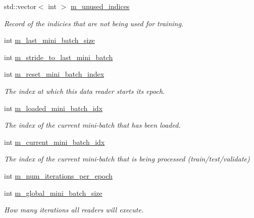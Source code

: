 \begin{DoxyCompactItemize}
\item 
std\+::vector$<$ int $>$ \hyperlink{classlbann_1_1generic__data__reader_a0bc0ee42e95d23687ddcc30d6c338b19}{m\+\_\+unused\+\_\+indices}
\begin{DoxyCompactList}\small\item\em Record of the indicies that are not being used for training. \end{DoxyCompactList}\item 
int \hyperlink{classlbann_1_1generic__data__reader_a241f77b6209de4ae656bc34ad51bb612}{m\+\_\+last\+\_\+mini\+\_\+batch\+\_\+size}
\item 
int \hyperlink{classlbann_1_1generic__data__reader_ac46922f2ef4f392bcc7c59c21685a3ff}{m\+\_\+stride\+\_\+to\+\_\+last\+\_\+mini\+\_\+batch}
\item 
int \hyperlink{classlbann_1_1generic__data__reader_af29f62579a408d1548a124442bcf181d}{m\+\_\+reset\+\_\+mini\+\_\+batch\+\_\+index}
\begin{DoxyCompactList}\small\item\em The index at which this data reader starts its epoch. \end{DoxyCompactList}\item 
int \hyperlink{classlbann_1_1generic__data__reader_a2cfc5a3e6de8a8a24d3525ec3ed586fb}{m\+\_\+loaded\+\_\+mini\+\_\+batch\+\_\+idx}
\begin{DoxyCompactList}\small\item\em The index of the current mini-\/batch that has been loaded. \end{DoxyCompactList}\item 
int \hyperlink{classlbann_1_1generic__data__reader_aefd4bc0bf95de1e2500827581acf3536}{m\+\_\+current\+\_\+mini\+\_\+batch\+\_\+idx}
\begin{DoxyCompactList}\small\item\em The index of the current mini-\/batch that is being processed (train/test/validate) \end{DoxyCompactList}\item 
int \hyperlink{classlbann_1_1generic__data__reader_ab570063483a1f604ca2fc536c3d83de7}{m\+\_\+num\+\_\+iterations\+\_\+per\+\_\+epoch}
\item 
int \hyperlink{classlbann_1_1generic__data__reader_a7cd8fa7b1db9ea3d154a411f36992476}{m\+\_\+global\+\_\+mini\+\_\+batch\+\_\+size}
\begin{DoxyCompactList}\small\item\em How many iterations all readers will execute. \end{DoxyCompactList}\item 

\end{DoxyCompactItemize}
